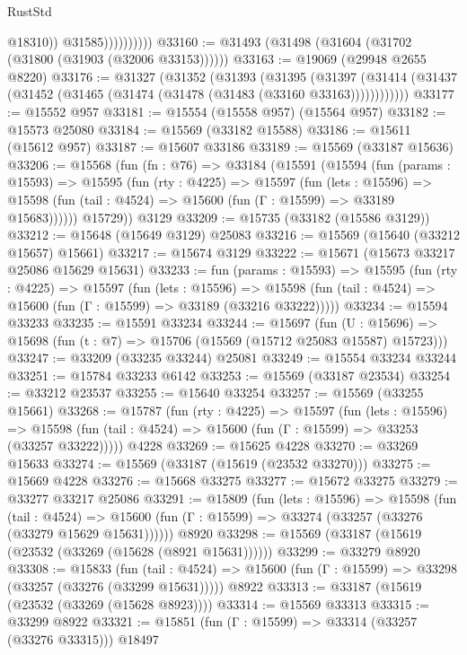 \begin{lexlean}{RustStd}
\begin{coremodule}
                            @18310))
                        @31585))))))))))
@33160 := @31493 (@31498 (@31604 (@31702 (@31800 (@31903 (@32006 @33153))))))
@33163 := @19069 (@29948 @2655 @8220)
@33176 := @31327
    (@31352
      (@31393
        (@31395
          (@31397 (@31414 (@31437 (@31452 (@31465 (@31474 (@31478 (@31483 (@33160 @33163))))))))))))
@33177 := @15552 @957
@33181 := @15554 (@15558 @957) (@15564 @957)
@33182 := @15573 @25080
@33184 := @15569 (@33182 @15588)
@33186 := @15611 (@15612 @957)
@33187 := @15607 @33186
@33189 := @15569 (@33187 @15636)
@33206 := @15568
    (fun (fn : @76) =>
    @33184
      (@15591
        (@15594
          (fun (params : @15593) =>
          @15595
            (fun (rty : @4225) =>
            @15597
              (fun (lets : @15596) =>
              @15598 (fun (tail : @4524) => @15600 (fun (Γ : @15599) => @33189 @15683))))))
        @15729))
    @3129
@33209 := @15735 (@33182 (@15586 @3129))
@33212 := @15648 (@15649 @3129) @25083
@33216 := @15569 (@15640 (@33212 @15657) @15661)
@33217 := @15674 @3129
@33222 := @15671 (@15673 @33217 @25086 @15629 @15631)
@33233 := fun (params : @15593) =>
  @15595
    (fun (rty : @4225) =>
    @15597
      (fun (lets : @15596) =>
      @15598 (fun (tail : @4524) => @15600 (fun (Γ : @15599) => @33189 (@33216 @33222)))))
@33234 := @15594 @33233
@33235 := @15591 @33234
@33244 := @15697
    (fun (U : @15696) => @15698 (fun (t : @7) => @15706 (@15569 (@15712 @25083 @15587) @15723)))
@33247 := @33209 (@33235 @33244) @25081
@33249 := @15554 @33234 @33244
@33251 := @15784 @33233 @6142
@33253 := @15569 (@33187 @23534)
@33254 := @33212 @23537
@33255 := @15640 @33254
@33257 := @15569 (@33255 @15661)
@33268 := @15787
    (fun (rty : @4225) =>
    @15597
      (fun (lets : @15596) =>
      @15598 (fun (tail : @4524) => @15600 (fun (Γ : @15599) => @33253 (@33257 @33222)))))
    @4228
@33269 := @15625 @4228
@33270 := @33269 @15633
@33274 := @15569 (@33187 (@15619 (@23532 @33270)))
@33275 := @15669 @4228
@33276 := @15668 @33275
@33277 := @15672 @33275
@33279 := @33277 @33217 @25086
@33291 := @15809
    (fun (lets : @15596) =>
    @15598
      (fun (tail : @4524) =>
      @15600 (fun (Γ : @15599) => @33274 (@33257 (@33276 (@33279 @15629 @15631))))))
    @8920
@33298 := @15569 (@33187 (@15619 (@23532 (@33269 (@15628 (@8921 @15631))))))
@33299 := @33279 @8920
@33308 := @15833
    (fun (tail : @4524) => @15600 (fun (Γ : @15599) => @33298 (@33257 (@33276 (@33299 @15631)))))
    @8922
@33313 := @33187 (@15619 (@23532 (@33269 (@15628 @8923))))
@33314 := @15569 @33313
@33315 := @33299 @8922
@33321 := @15851 (fun (Γ : @15599) => @33314 (@33257 (@33276 @33315))) @18497

\end{coremodule}
\end{lexlean}
